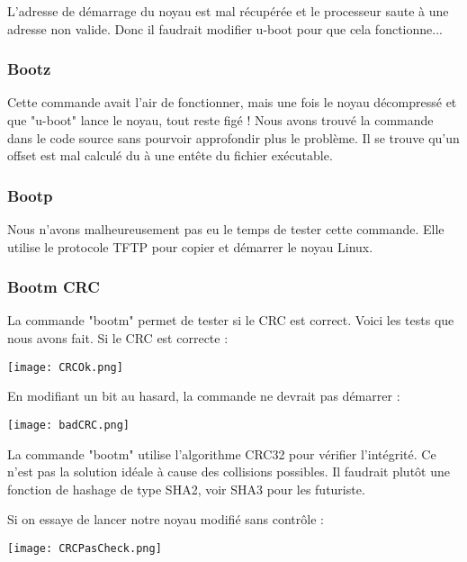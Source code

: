 L'adresse de démarrage du noyau est mal récupérée et le processeur saute à une adresse non valide. Donc il faudrait modifier u-boot pour que cela fonctionne... 

\subsubsection{Bootz}

Cette commande avait l'air de fonctionner, mais une fois le noyau décompressé et que "u-boot" lance le noyau, tout reste figé ! Nous avons trouvé la commande dans le code source sans pourvoir approfondir plus le problème. Il se trouve qu'un offset est mal calculé du à une entête du fichier exécutable.

\subsubsection{Bootp}
Nous n'avons malheureusement pas eu le temps de tester cette commande. Elle utilise le protocole TFTP pour copier et démarrer le noyau Linux.

\pagebreak
\subsubsection{Bootm CRC}

La commande "bootm" permet de tester si le CRC est correct. Voici les tests que nous avons fait. Si le CRC est correcte : 
\begin{center} 
\hspace{15cm}
\texttt{[image: CRCOk.png]}
\end{center}
\vspace{0.5cm}

En modifiant un bit au hasard, la commande ne devrait pas démarrer :
\begin{center} 
\hspace{15cm}
\texttt{[image: badCRC.png]}
\end{center}
\vspace{0.5cm}

La commande "bootm" utilise l'algorithme CRC32 pour vérifier l'intégrité. Ce n'est pas la solution idéale à cause des collisions possibles. Il faudrait plutôt une fonction de hashage de type SHA2, voir SHA3 pour les futuriste.

Si on essaye de lancer notre noyau modifié sans contrôle :
\begin{center} 
\hspace{15cm}
\texttt{[image: CRCPasCheck.png]}
\end{center}
\vspace{0.5cm}

